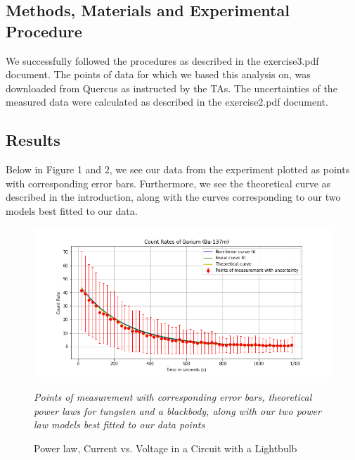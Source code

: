 \documentclass[letterpaper,12pt]{article}
\begin{document}
\subsection{Methods, Materials and Experimental Procedure}

We successfully followed the procedures as described in the exercise3.pdf 
document.
The points of data for which we based this analysis on, 
was downloaded from Quercus as instructed by the TAs. 
The uncertainties of the measured data were calculated as described 
in the exercise2.pdf document.

\subsection{Results}

Below in Figure 1 and 2, we see our data from the experiment 
plotted as points with corresponding error bars. 
Furthermore, we see the theoretical curve as described in the introduction, 
along with the curves corresponding to our two models best fitted to our data. 

\begin{figure}[H]
  \centering
  \includegraphics[width=0.95\linewidth]{../Exercise2/Fredrik/Count Rates of Barium (Ba-137m).png}    
  \begin{center}
    \emph{
    Points of measurement with corresponding error bars, theoretical power laws for 
  tungsten and a blackbody, along with our two power law models best fitted to our data 
  points}
  \end{center}
  \caption{Power law, Current vs. Voltage in a Circuit with a Lightbulb}
  \label{power-law}
\end{figure}
\end{document}

